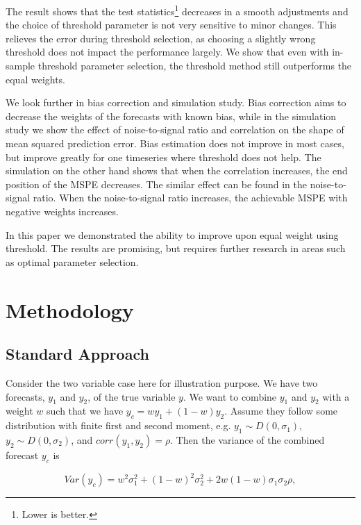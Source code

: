 \documentclass[11pt]{article}
\let\rmarkdownfootnote\footnote%
\def\footnote{\protect\rmarkdownfootnote}
\begin{document}
The result shows that the test statistics\footnote{Lower is better.} decreases in a smooth adjustments and the choice of threshold parameter is not very sensitive to minor changes. This relieves the error during threshold selection, as choosing a slightly wrong threshold does not impact the performance largely. We show that even with in-sample threshold parameter selection, the threshold method still outperforms the equal weights.

We look further in bias correction and simulation study. Bias correction aims to decrease the weights of the forecasts with known bias, while in the simulation study we show the effect of noise-to-signal ratio and correlation on the shape of mean squared prediction error. Bias estimation does not improve in most cases, but improve greatly for one timeseries where threshold does not help. The simulation on the other hand shows that when the correlation increases, the end position of the MSPE decreases. The similar effect can be found in the noise-to-signal ratio. When the noise-to-signal ratio increases, the achievable MSPE with negative weights increases.

In this paper we demonstrated the ability to improve upon equal weight using threshold. The results are promising, but requires further research in areas such as optimal parameter selection.


\section{Methodology}\label{methodology}

\subsection{Standard Approach}\label{standard-approach}

Consider the two variable case here for illustration purpose. We have
two forecasts, \(y_1\) and \(y_2\), of the true variable \(y\). We want
to combine \(y_1\) and \(y_2\) with a weight \(w\) such that we have
\(y_c = w y_1 + (1-w) y_2\). Assume they follow some distribution with finite first and second moment, e.g.
\(y_1 \sim D(0,\sigma_1)\), \(y_2 \sim D(0,\sigma_2)\), and
\(corr(y_1,y_2)=\rho\). Then the variance of the combined forecast
\(y_c\) is

\begin{equation}
\label{eqn: var yc}
Var(y_c) = w^2\sigma_1^2+ (1-w)^2\sigma_2^2+2w(1-w)\sigma_1\sigma_2\rho,
\end{equation}
\end{document}
